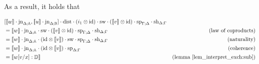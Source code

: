 \documentclass[10pt,a4paper]{amsart}
\theoremstyle{definition}
\theoremstyle{definition}
\theoremstyle{definition}
\theoremstyle{definition}
\theoremstyle{definition}
\theoremstyle{definition}
\begin{document}
As a result, it holds that

\begin{align*}
  & [\llbracket w\rrbracket \cdot \text{jn}_{\Delta;\mathbb{A}},\llbracket u \rrbracket\cdot \text{jn}_{\Delta;\mathbb{B}}] \cdot \text{dist} \cdot (i_1 \otimes \text{id}) \cdot \text{sw} \cdot ( \llbracket  v \rrbracket \otimes \text{id}) \cdot \text{sp}_{\Gamma;\Delta} \cdot \text{sh}_{\Delta;\Gamma} \\
  & = \llbracket  w \rrbracket\cdot \text{jn}_{\Delta;\mathbb{A}} \cdot   \text{sw} \cdot(\llbracket v \rrbracket \otimes  \text{id}) \cdot \text{sp}_{\Gamma;\Delta} \cdot \text{sh}_{\Delta; \Gamma}  & {\text{(law of coproducts)}} \\
  &=  \llbracket  w \rrbracket\cdot \text{jn}_{\Delta;\mathbb{A}}  \cdot(  \text{id}\otimes \llbracket v \rrbracket ) \cdot   \text{sw} \cdot \text{sp}_{\Gamma;\Delta} \cdot \text{sh}_{\Delta; \Gamma} & {\text{(naturality)}} \\
  &= \llbracket w \rrbracket \cdot \text{jn}_{\Delta;\mathbb{A}} \cdot( \text{id} \otimes \llbracket v \rrbracket) \cdot \text{sp}_{\Delta;\Gamma}& {\text{(coherence)}}\\
  & = \llbracket w[v/x] : \mathbb{D} \rrbracket  & {\text{(lemma \ref{lem_interpret_exch:sub})}}
\end{align*}

\end{document}
